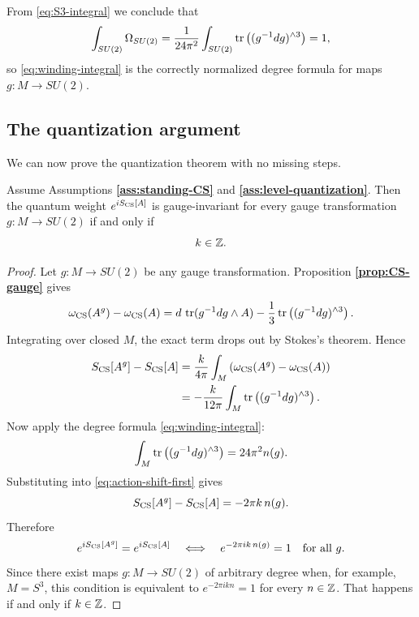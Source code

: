 \noindent From \eqref{eq:S3-integral} we conclude that
\begin{equation*}
\int_{SU(2)} \Omega_{SU(2)} = \frac{1}{24\pi^2}\int_{SU(2)}\operatorname{tr}\left((g^{-1}dg)^{\wedge 3}\right) = 1,
\end{equation*}
so \eqref{eq:winding-integral} is the correctly normalized degree formula for maps $g:M\to SU(2)$.

\subsection{The quantization argument}

We can now prove the quantization theorem with no missing steps.

\begin{theorem}\label{thm:level-quantization-su2}
Assume Assumptions \textbf{\ref{ass:standing-CS}} and \textbf{\ref{ass:level-quantization}}. Then the quantum weight $e^{iS_{\operatorname{CS}}[A]}$ is gauge-invariant for every gauge transformation $g:M\to SU(2)$ if and only if
\begin{equation}\label{eq:level-quant}
k\in \mathbb{Z}.
\end{equation}
\end{theorem}

\begin{proof}
Let $g:M\to SU(2)$ be any gauge transformation. Proposition \textbf{\ref{prop:CS-gauge}} gives
\begin{equation*}
\omega_{\operatorname{CS}}(A^g) - \omega_{\operatorname{CS}}(A)
=
d\,\operatorname{tr}(g^{-1}dg\wedge A) - \frac{1}{3}\operatorname{tr}\left((g^{-1}dg)^{\wedge 3}\right).
\end{equation*}
Integrating over closed $M$, the exact term drops out by Stokes's theorem. Hence
\begin{align}
S_{\operatorname{CS}}[A^g] - S_{\operatorname{CS}}[A]
&=
\frac{k}{4\pi}\int_M\left(\omega_{\operatorname{CS}}(A^g) - \omega_{\operatorname{CS}}(A)\right) \notag\\
&=
-\frac{k}{12\pi}\int_M \operatorname{tr}\left((g^{-1}dg)^{\wedge 3}\right).
\label{eq:action-shift-first}
\end{align}
Now apply the degree formula \eqref{eq:winding-integral}:
\begin{equation*}
\int_M \operatorname{tr}\left((g^{-1}dg)^{\wedge 3}\right) = 24\pi^2 n(g).
\end{equation*}
Substituting into \eqref{eq:action-shift-first} gives
\begin{equation}\label{eq:S-shift}
S_{\operatorname{CS}}[A^g] - S_{\operatorname{CS}}[A] = -2\pi k\, n(g).
\end{equation}
Therefore
\begin{equation*}
e^{iS_{\operatorname{CS}}[A^g]} = e^{iS_{\operatorname{CS}}[A]}
\quad\Longleftrightarrow\quad
e^{-2\pi i k\, n(g)} = 1
\quad\text{for all } g.
\end{equation*}
Since there exist maps $g:M\to SU(2)$ of arbitrary degree when, for example, $M=S^3$, this condition is equivalent to $e^{-2\pi i k n}=1$ for every $n\in\mathbb{Z}$. That happens if and only if $k\in\mathbb{Z}$.
\end{proof}

